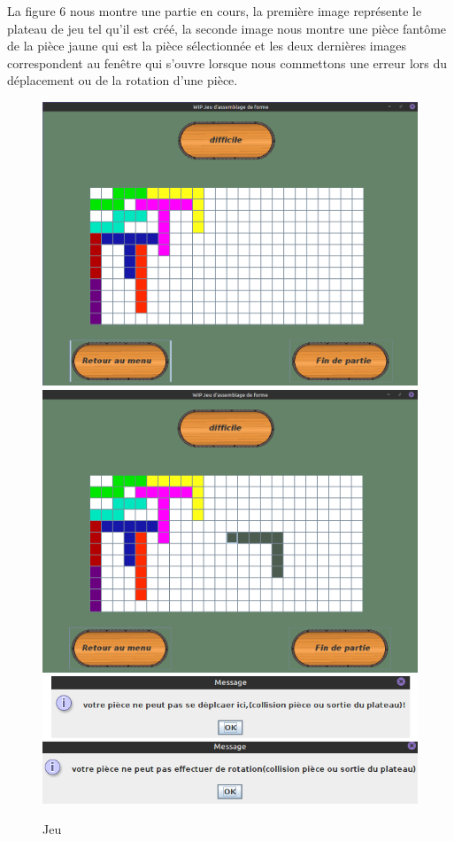 \documentclass[12pt]{article}
\begin{document}
La figure 6 nous montre une partie en cours, la première image représente le plateau de jeu tel qu'il est créé, la seconde image nous montre une pièce fantôme de la pièce jaune qui est la pièce sélectionnée et les deux dernières images correspondent au fenêtre qui s'ouvre lorsque nous commettons une erreur lors du déplacement ou de la rotation d'une pièce.


\begin{figure}[h]
\begin{center}
\includegraphics[scale=0.125]{Images/Jeu1.png}
\includegraphics[scale=0.125]{Images/Jeu2.png}
\includegraphics[scale=0.2]{Images/erreur.png}
\end{center}
\caption{Jeu}
\end{figure}
\end{document}
